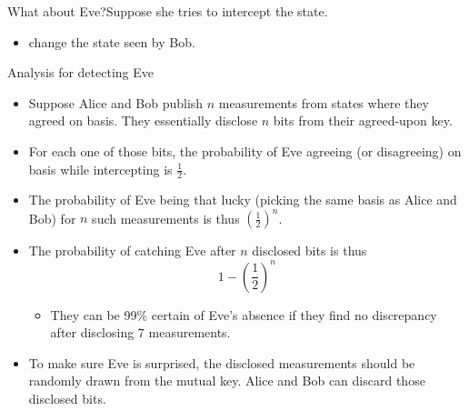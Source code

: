 \begin{frame}{What about Eve?}{Suppose she tries to intercept the state.}
{\begin{BBKey}
{\begin{itemize}
\begin{itemize}
\begin{itemize}
            \item<8-> change the state seen by Bob.
        \end{itemize}
    \end{itemize}
\end{itemize}
}
\end{BBKey}
}
\end{frame}

\begin{frame}{Analysis for detecting Eve}
\Vskip{-3em}\begin{itemize}[<+->]
    \item Suppose Alice and Bob publish $n$ measurements from states where they agreed on basis.  They essentially disclose $n$ bits from their agreed-upon key.
    \item For each one of those bits, the probability of Eve agreeing (or disagreeing) on basis while intercepting is $\frac{1}{2}$.
    \item The probability of Eve being that lucky (picking the same basis as Alice and Bob) for $n$ such measurements is thus $\left(\frac{1}{2}\right)^{n}$.
    \item The probability of catching Eve after $n$ disclosed bits is thus
    \[ 1 - \left(\frac{1}{2}\right)^{n} \]
    \begin{itemize}
    \item They can be 99\% certain of Eve's absence if they find no discrepancy after disclosing $7$ measurements. 
    \end{itemize}
    \item To make sure Eve is surprised, the disclosed measurements should be randomly drawn from the mutual key.  Alice and Bob can discard those disclosed bits.
\end{itemize}

\end{frame}

